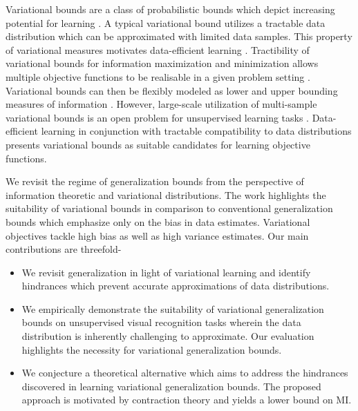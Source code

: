 \documentclass{article}
\begin{document}
Variational bounds \cite{variational} are a class of probabilistic bounds which depict increasing potential for learning \cite{mine,visual,cpc}. A typical variational bound utilizes a tractable data distribution which can be approximated with limited data samples. This property of variational measures motivates data-efficient learning \cite{cpcv2}. Tractibility of variational bounds for information maximization and minimization allows multiple objective functions to be realisable in a given problem setting \cite{variational}. Variational bounds can then be flexibly modeled as lower and upper bounding measures of information \cite{variational}. However, large-scale utilization of multi-sample variational bounds is an open problem for unsupervised learning tasks \cite{variational}. Data-efficient learning in conjunction with tractable compatibility to data distributions presents variational bounds as suitable candidates for learning objective functions.

We revisit the regime of generalization bounds from the perspective of information theoretic and variational distributions. The work highlights the suitability of variational bounds in comparison to conventional generalization bounds which emphasize only on the bias in data estimates. Variational objectives tackle high bias as well as high variance estimates. Our main contributions are threefold- 

\begin{itemize}
    \item We revisit generalization in light of variational learning and identify hindrances which prevent accurate  approximations of data distributions.
    \item We empirically demonstrate the suitability of variational generalization bounds on unsupervised visual recognition tasks wherein the data distribution is inherently challenging to approximate.  Our evaluation highlights the necessity for variational generalization bounds.
    \item We conjecture a theoretical alternative which aims to address the hindrances discovered in learning variational generalization bounds. The proposed approach is motivated by contraction theory and yields a lower bound on MI. 
  \end{itemize}
\end{document}
